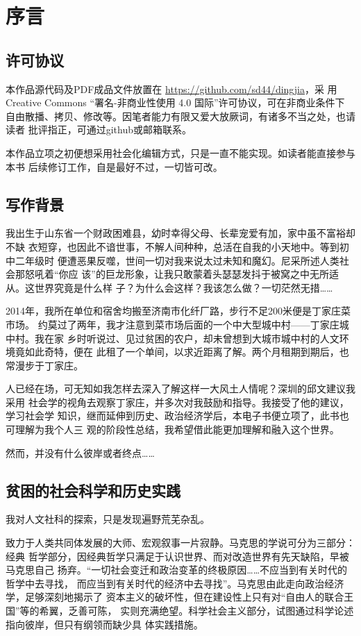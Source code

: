 \chapter{序言}
\label{chap:preface}

\section*{许可协议}

本作品源代码及PDF成品文件放置在 \url{https://github.com/sd44/dingjia}，采
用 Creative Commons “署名-非商业性使用 4.0 国际”许可协议，可在非商业条件下
自由散播、拷贝、修改等。因笔者能力有限又爱大放厥词，有诸多不当之处，也请读者
批评指正，可通过github或邮箱联系。

本作品立项之初便想采用社会化编辑方式，只是一直不能实现。如读者能直接参与本书
后续修订工作，自是最好不过，一切皆可改。

\section*{写作背景}

我出生于山东省一个财政困难县，幼时幸得父母、长辈宠爱有加，家中虽不富裕却不缺
衣短穿，也因此不谙世事，不解人间种种，总活在自我的小天地中。等到初中二年级时
便遭恶果反噬，世间一切对我来说太过未知和魔幻。尼采所述人类社会那怒吼着“你应
该”的巨龙形象，让我只敢蒙着头瑟瑟发抖于被窝之中无所适从。这世界究竟是什么样
子？为什么会这样？我该怎么做？一切茫然无措……

2014年，我所在单位和宿舍均搬至济南市化纤厂路，步行不足200米便是丁家庄菜市场。
约莫过了两年，我才注意到菜市场后面的一个中大型城中村——丁家庄城中村。我在家
乡时听说过、见过贫困的农户，却未曾想到大城市城中村的人文环境竟如此奇特，便在
此租了一个单间，以求近距离了解。两个月租期到期后，也常漫步于丁家庄。

人已经在场，可无知如我怎样去深入了解这样一大风土人情呢？深圳的邱文建议我采用
社会学的视角去观察丁家庄，并多次对我鼓励和指导。我接受了他的建议，学习社会学
知识，继而延伸到历史、政治经济学后，本电子书便立项了，此书也可理解为我个人三
观的阶段性总结，我希望借此能更加理解和融入这个世界。

然而，并没有什么彼岸或者终点……

\section*{贫困的社会科学和历史实践}

我对人文社科的探索，只是发现遍野荒芜杂乱。

致力于人类共同体发展的大师、宏观叙事一片寂静。马克思的学说可分为三部分：经典
哲学部分，因经典哲学只满足于认识世界、而对改造世界有先天缺陷，早被马克思自己
扬弃。“一切社会变迁和政治变革的终极原因……不应当到有关时代的哲学中去寻找，
而应当到有关时代的经济中去寻找”。马克思由此走向政治经济学，足够深刻地揭示了
资本主义的破坏性，但在建设性上只有对“自由人的联合王国”等的希翼，乏善可陈，
实则充满绝望。科学社会主义部分，试图通过科学论述指向彼岸，但只有纲领而缺少具
体实践措施。

